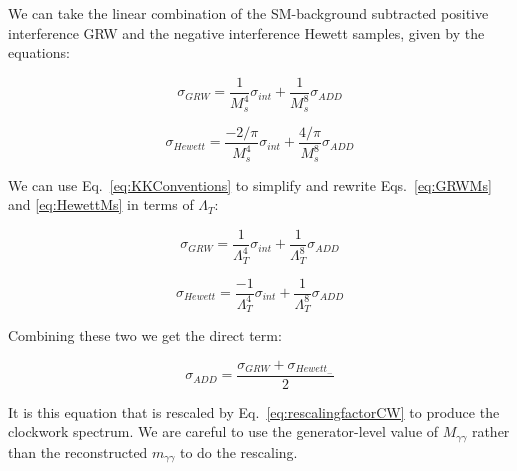 

We can take the linear combination of the SM-background subtracted positive interference GRW and the negative interference Hewett samples, given by the equations:

\begin{equation}
\sigma_{GRW} = \frac{1}{M^4_{s}} \sigma_{int} + \frac{1}{M^8_{s}} \sigma_{ADD}
\label{eq:GRWMs}
\end{equation}

\begin{equation}
\sigma_{Hewett} = \frac{-2/\pi}{M^4_{s}} \sigma_{int} + \frac{4/\pi}{M^8_{s}} \sigma_{ADD}
\label{eq:HewettMs}
\end{equation}

We can use Eq.~\ref{eq:KKConventions} to simplify and rewrite Eqs.~\ref{eq:GRWMs} and \ref{eq:HewettMs} in terms of $\Lambda_{T}$:

\begin{equation}
\sigma_{GRW} = \frac{1}{\Lambda^4_{T}} \sigma_{int} + \frac{1}{\Lambda^8_{T}} \sigma_{ADD}
\label{eq:GRWLambdaT}
\end{equation}

\begin{equation}
\sigma_{Hewett} = \frac{-1}{\Lambda^4_{T}} \sigma_{int} + \frac{1}{\Lambda^8_{T}} \sigma_{ADD}
\label{eq:HewettLambdaT}
\end{equation}

Combining these two we get the direct term:

\begin{equation}
\sigma_{ADD} = \frac{\sigma_{GRW}+\sigma_{Hewett_{-}}}{2}
\label{eq:GRWLambdaT}
\end{equation}

It is this equation that is rescaled by Eq.~\ref{eq:rescalingfactorCW} to produce the clockwork spectrum. We are careful to use the generator-level value of $M_{\gamma\gamma}$ rather than the reconstructed $m_{\gamma\gamma}$ to do the rescaling.

